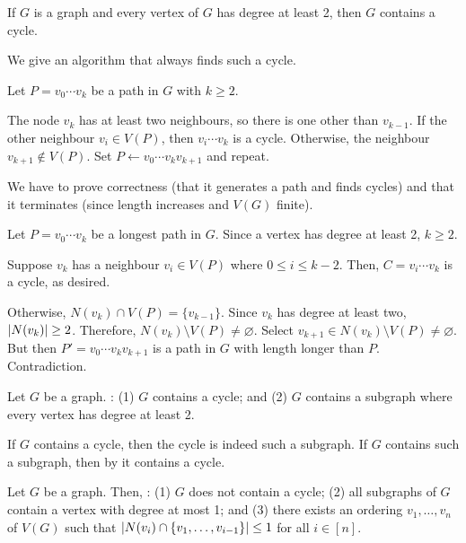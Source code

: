 \begin{theorem}[4.6.4]\label{thm:deg2cycle}
  If $G$ is a graph and every vertex of $G$ has degree at least 2,
  then $G$ contains a cycle.
\end{theorem}
\begin{prf}
  We give an algorithm that always finds such a cycle.

  Let $P = v_0\cdots v_k$ be a path in $G$ with $k \geq 2$.

  The node $v_k$ has at least two neighbours, so there is one other than $v_{k-1}$.
  If the other neighbour $v_i \in V(P)$,
  then $v_i \cdots v_k$ is a cycle.
  Otherwise, the neighbour $v_{k+1} \not\in V(P)$.
  Set $P \gets v_0\cdots v_k v_{k+1}$ and repeat.

  We have to prove correctness (that it generates a path and finds cycles)
  and that it terminates (since length increases and $V(G)$ finite).
\end{prf}
\begin{prf}
  Let $P = v_0 \cdots v_k$ be a longest path in $G$.
  Since a vertex has degree at least 2, $k \geq 2$.

  Suppose $v_k$ has a neighbour $v_i \in V(P)$ where $0 \leq i \leq k-2$.
  Then, $C = v_i \cdots v_k$ is a cycle, as desired.

  Otherwise, $N(v_k) \cap V(P) = \{v_{k-1}\}$.
  Since $v_k$ has degree at least two, $\abs{N(v_k)} \geq 2$.
  Therefore, $N(v_k) \setminus V(P) \neq \varnothing$.
  Select $v_{k+1} \in N(v_k) \setminus V(P) \neq \varnothing$.
  But then $P' = v_0 \cdots v_k v_{k+1}$ is a path in $G$ with length longer than $P$.
  Contradiction.
\end{prf}
\begin{corollary}\label{cor:464-pos}
  Let $G$ be a graph. \TFAE:
  (1) $G$ contains a cycle; and
  (2) $G$ contains a subgraph where every vertex has degree at least 2.
\end{corollary}
\begin{prf}
  If $G$ contains a cycle, then the cycle is indeed such a subgraph.
  If $G$ contains such a subgraph, then by  it contains a cycle.
\end{prf}
\begin{corollary}\label{cor:464-neg}
  Let $G$ be a graph. Then, \Tfae:
  (1) $G$ does not contain a cycle;
  (2) all subgraphs of $G$ contain a vertex with degree at most 1; and
  (3) there exists an ordering $v_1,\dotsc,v_n$ of $V(G)$ such that
  $\abs{N(v_i) \cap \{v_1,\dotsc,v_{i-1}\}} \leq 1$ for all $i \in [n]$.
\end{corollary}

